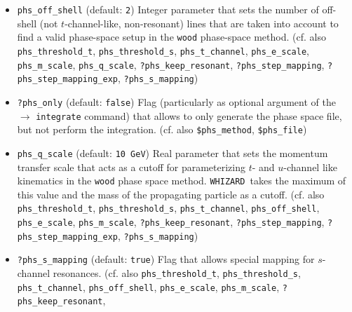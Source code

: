\documentclass[12pt]{book}
\newcommand{\ttt}[1]{\texttt{#1}}
\newcommand{\whizard}{\texttt{WHIZARD}}
\begin{document}
\begin{itemize}
phase space method. \whizard\ takes the maximum of this value and the
mass of the propagating particle as a cutoff. (cf. also
\ttt{phs\_threshold\_t}, \ttt{phs\_threshold\_s},
\ttt{phs\_t\_channel}, \ttt{phs\_off\_shell},  \ttt{phs\_e\_scale},
\ttt{phs\_q\_scale}, \newline \ttt{?phs\_keep\_resonant},
\ttt{?phs\_step\_mapping}, \ttt{?phs\_step\_mapping\_exp}, 
\ttt{?phs\_s\_mapping}) 
\item
\ttt{phs\_off\_shell} \qquad (default: \ttt{2}) \newline
Integer parameter that sets the number of off-shell (not
$t$-channel-like, non-resonant) lines that are taken into account to
find a valid phase-space setup in the \ttt{wood} phase-space method. 
(cf. also \ttt{phs\_threshold\_t},
\ttt{phs\_threshold\_s}, \ttt{phs\_t\_channel}, \ttt{phs\_e\_scale}, 
\ttt{phs\_m\_scale}, \ttt{phs\_q\_scale},
\ttt{?phs\_keep\_resonant}, \ttt{?phs\_step\_mapping},
\newline \ttt{?phs\_step\_mapping\_exp}, 
\ttt{?phs\_s\_mapping}) 
\item
\ttt{?phs\_only} \qquad (default: \ttt{false}) \newline
Flag (particularly as optional argument of the $\to$ \ttt{integrate}
command) that allows to only generate the phase space file, but not
perform the integration. (cf. also \ttt{\$phs\_method},
\ttt{\$phs\_file}) 
\item
\ttt{phs\_q\_scale} \qquad (default: \ttt{10 GeV}) \newline
Real parameter that sets the momentum transfer scale that acts as a
cutoff for parameterizing $t$- and $u$-channel like kinematics in the
\ttt{wood} phase space method. \whizard\ takes the maximum of this
value and the mass of the propagating particle as a cutoff. (cf. also 
\ttt{phs\_threshold\_t}, \ttt{phs\_threshold\_s},
\ttt{phs\_t\_channel}, \ttt{phs\_off\_shell},  \ttt{phs\_e\_scale},
\ttt{phs\_m\_scale}, \ttt{?phs\_keep\_resonant},
\ttt{?phs\_step\_mapping}, \ttt{?phs\_step\_mapping\_exp}, 
\newline \ttt{?phs\_s\_mapping}) 
\item
\ttt{?phs\_s\_mapping} \qquad (default: \ttt{true}) \newline
Flag that allows special mapping for $s$-channel resonances. 
(cf. also \ttt{phs\_threshold\_t}, \ttt{phs\_threshold\_s},
\ttt{phs\_t\_channel}, \ttt{phs\_off\_shell},  \ttt{phs\_e\_scale},
\ttt{phs\_m\_scale}, \newline \ttt{?phs\_keep\_resonant},

\end{itemize}
\end{document}
